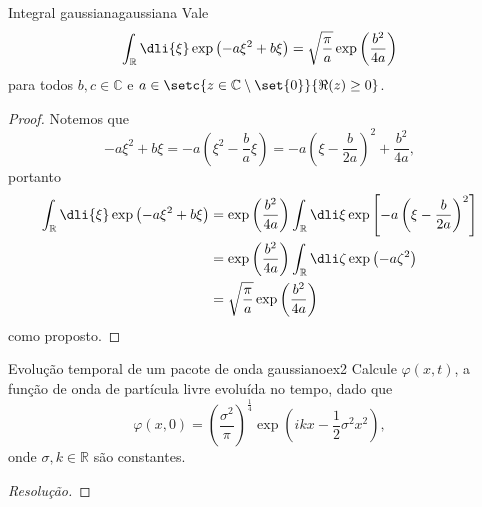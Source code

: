 \begin{lemma}{Integral gaussiana}{gaussiana}
    Vale
    \begin{equation*}
       \int_{\mathbb{R}} \dli{\xi} \exp\left(-a \xi^2 + b \xi\right) = \sqrt{\frac{\pi}{a}} \exp\left(\frac{b^2}{4a}\right)
    \end{equation*}
    para todos \(b,c \in \mathbb{C}\) e \(a \in \setc{z \in \mathbb{C}\setminus\set{0}}{\Re(z) \geq 0}\).
\end{lemma}
\begin{proof}
    Notemos que
    \begin{equation*}
       -a \xi^2 + b \xi = - a \left(\xi^2 - \frac{b}{a}\xi\right) = -a \left(\xi - \frac{b}{2a}\right)^2 + \frac{b^2}{4a},
    \end{equation*}
    portanto
    \begin{align*}
       \int_{\mathbb{R}} \dli{\xi} \exp\left(-a \xi^2 + b \xi\right) &= \exp\left(\frac{b^2}{4a}\right) \int_{\mathbb{R}} \dli\xi \exp\left[-a \left(\xi - \frac{b}{2a}\right)^2\right]\\
                                                                     &= \exp\left(\frac{b^2}{4a}\right) \int_{\mathbb{R}} \dli\zeta \exp\left(-a \zeta^2\right)\\
                                                                     &= \sqrt{\frac{\pi}{a}} \exp\left(\frac{b^2}{4a}\right)
    \end{align*}
    como proposto.
\end{proof}

\begin{exercício}{Evolução temporal de um pacote de onda gaussiano}{ex2}
   Calcule \(\varphi(x,t)\), a função de onda de partícula livre evoluída no tempo, dado que
   \begin{equation*}
      \varphi(x,0) = \left(\frac{\sigma^2}{\pi}\right)^{\frac14}\exp\left(ikx - \frac12 \sigma^2 x^2\right),
   \end{equation*}
   onde \(\sigma, k \in \mathbb{R}\) são constantes.
\end{exercício}
\begin{proof}[Resolução]

\end{proof}
